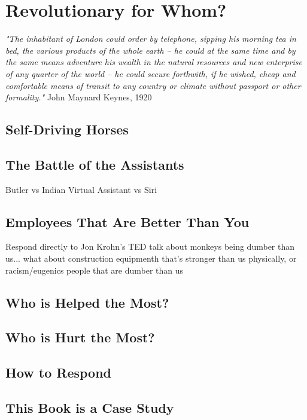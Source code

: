 \setchapterpreamble[u]{\margintoc}
\chapter{Revolutionary for Whom?}

\textit{"The inhabitant of London could order by telephone, sipping his morning tea in bed, the various products of the whole earth -- he could at the same time and by the same means adventure his wealth in the natural resources and new enterprise of any quarter of the world -- he could secure forthwith, if he wished, cheap and comfortable means of transit to any country or climate without passport or other formality."} John Maynard Keynes, 1920 \cite{Keynes2012}

\section{Self-Driving Horses}

\section{The Battle of the Assistants}

Butler vs Indian Virtual Assistant vs Siri

\section{Employees That Are Better Than You}

Respond directly to Jon Krohn's TED talk about monkeys being dumber than us... what about construction equipmenth that's stronger than us physically, or racism/eugenics people that are dumber than us 

\section{Who is Helped the Most?}

\section{Who is Hurt the Most?}

\section{How to Respond}

\section{This Book is a Case Study}
